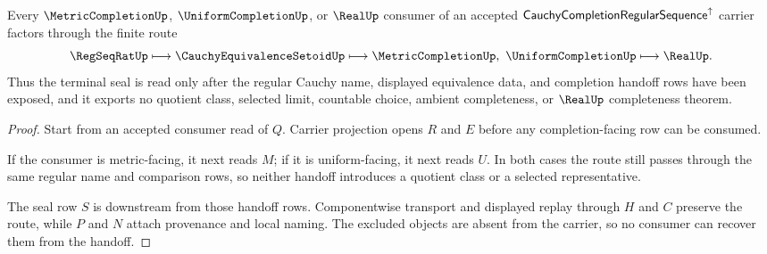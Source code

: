 \begin{theorem}
\label{thm:cauchy-completion-regular-sequence-real-seal-handoff}
Every $\MetricCompletionUp$, $\UniformCompletionUp$, or $\RealUp$ consumer of an accepted $\mathsf{CauchyCompletionRegularSequence}^{\uparrow}$ carrier factors through the finite route
$$
\RegSeqRatUp \longmapsto \CauchyEquivalenceSetoidUp \longmapsto
\MetricCompletionUp,\ \UniformCompletionUp \longmapsto \RealUp .
$$
Thus the terminal seal is read only after the regular Cauchy name, displayed equivalence data, and completion handoff rows have been exposed, and it exports no quotient class, selected limit, countable choice, ambient completeness, or $\RealUp$ completeness theorem.
\end{theorem}
\begin{proof}
Start from an accepted consumer read of $Q$. Carrier projection opens $R$ and $E$ before any completion-facing row can be consumed.

If the consumer is metric-facing, it next reads $M$; if it is uniform-facing, it next reads $U$. In both cases the route still passes through the same regular name and comparison rows, so neither handoff introduces a quotient class or a selected representative.

The seal row $S$ is downstream from those handoff rows. Componentwise transport and displayed replay through $H$ and $C$ preserve the route, while $P$ and $N$ attach provenance and local naming. The excluded objects are absent from the carrier, so no consumer can recover them from the handoff.
\end{proof}




